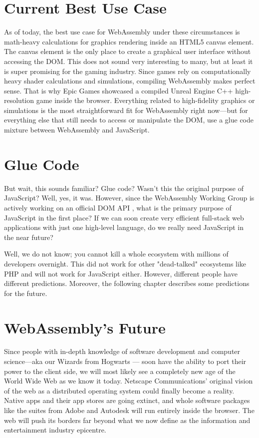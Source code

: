 \documentclass[10pt]{article}
\begin{document}
\begin{sloppypar}
  \section{Current Best Use Case}
  \label{sec:use-cases}

  As of today, the best use case for WebAssembly under these circumstances is math-heavy calculations for graphics rendering inside an HTML5 canvas element. The canvas element is the only place to create a graphical user interface without accessing the DOM. This does not sound very interesting to many, but at least it is super promising for the gaming industry. Since games rely on computationally heavy shader calculations and simulations, compiling WebAssembly makes perfect sense. That is why Epic Games showcased a compiled Unreal Engine C++ high-resolution game inside the browser. Everything related to high-fidelity graphics or simulations is the most straightforward fit for WebAssembly right now—but for everything else that still needs to access or manipulate the DOM, use a glue code mixture between WebAssembly and JavaScript.

  \section{Glue Code}
  \label{sec:glue-code}

  But wait, this sounds familiar? Glue code? Wasn’t this the original purpose of JavaScript? Well, yes, it was. However, since the WebAssembly Working Group is actively working on an official DOM API \citep{mozilla_webassemblymodule_2023}, what is the primary purpose of JavaScript in the first place? If we can soon create very efficient full-stack web applications with just one high-level language, do we really need JavaScript in the near future?

  Well, we do not know; you cannot kill a whole ecosystem with millions of developers overnight. This did not work for other "dead-talked" ecosystems like PHP and will not work for JavaScript either. However, different people have different predictions. Moreover, the following chapter describes some predictions for the future.

  \section{WebAssembly's Future}
  \label{sec:webassembly-future}

  Since people with in-depth knowledge of software development and computer science—aka our Wizards from Hogwarts — soon have the ability to port their power to the client side, we will most likely see a completely new age of the World Wide Web as we know it today. Netscape Communications’ original vision of the web as a distributed operating system could finally become a reality. Native apps and their app stores are going extinct, and whole software packages like the suites from Adobe and Autodesk will run entirely inside the browser. The web will push its borders far beyond what we now define as the information and entertainment industry epicentre.


\end{sloppypar}
\end{document}
